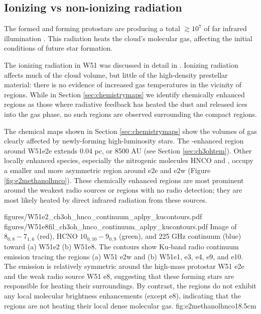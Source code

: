 \documentclass{aa}
\begin{document}
\subsection{Ionizing vs non-ionizing radiation}
\label{sec:nonionizingradiation}
The formed and forming protostars are producing a total $\gtrsim10^7$ \lsun of
far infrared illumination \citep{Ginsburg2016b}.  This radiation heats the
cloud's molecular gas, affecting the initial conditions of future star
formation.

The ionizing radiation in W51 was discussed in detail in \citet{Ginsburg2016b}.
Ionizing radiation affects much of the cloud volume, but little of the
high-density prestellar material:  there is no evidence of increased gas
temperatures in the vicinity of \hii regions.  While in Section
\ref{sec:chemistrymaps} we identify chemically enhanced regions as those where
radiative feedback has heated the dust and released ices into the gas phase, no
such regions are observed surrounding the compact \hii regions.


The chemical maps shown in Section \ref{sec:chemistrymaps} show the volumes of
gas clearly affected by newly-forming high-luminosity stars.  The
\methanol-enhanced region around W51e2e extends 0.04 pc, or 8500 AU (see Section
\ref{sec:ch3ohtem}). Other locally enhanced species, especially the nitrogenic
molecules HNCO and \formamide, occupy a smaller and more asymmetric region
around e2e and e2w (Figure \ref{fig:e2methanolhnco}).  These chemically enhanced
regions are most prominent around the weakest radio sources or regions with
no radio detection; they are most likely heated by direct infrared radiation
from these sources.

\FigureTwo
{figures/W51e2_ch3oh_hnco_continuum_aplpy_kucontours.pdf}
{figures/W51e8fil_ch3oh_hnco_continuum_aplpy_kucontours.pdf}
{Image of \methanol $8_{0,8}-7_{1,6}$ (red), HCNO $10_{0,10}-9_{0,9}$ (green), and 225 GHz
continuum (blue) toward (a) W51e2 (b) W51e8.  The contours show Ku-band radio continuum
emission tracing the \hii regions (a) W51 e2w and (b) W51e1, e3, e4, e9, and
e10.  The \methanol emission is relatively symmetric around the high-mass
protostar W51 e2e and the weak radio source W51 e8, suggesting that these
forming stars are responsible for heating their surroundings.  By contrast, the
\hii regions do not exhibit any local molecular brightness enhancements (except
e8), indicating that the \hii regions are not heating their local dense
molecular gas.}
{fig:e2methanolhnco}{1}{8.5cm}
 
\end{document}
